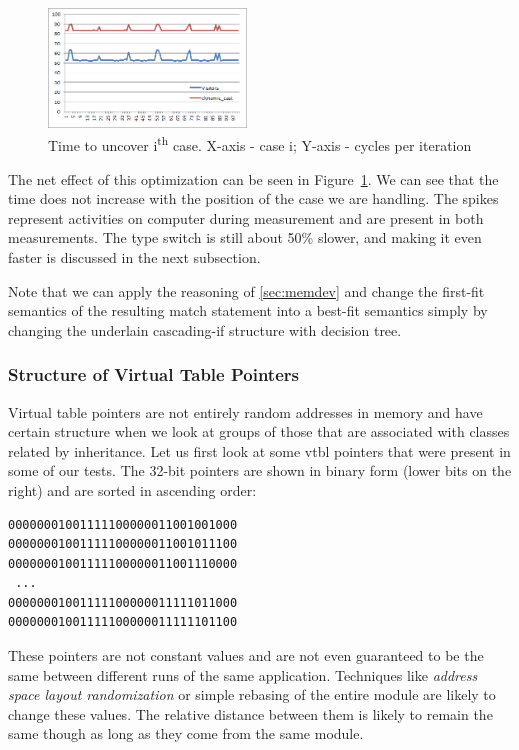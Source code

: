 \documentclass[preprint]{sigplanconf}
\begin{document}
\begin{figure}[htbp]
  \centering
    \includegraphics[width=0.47\textwidth]{DCast-vs-Visitors3.png}
  \caption{Time to uncover i\textsuperscript{th} case. X-axis - case i; Y-axis - cycles per iteration}
  \label{fig:DCastVis3}
\end{figure}

The net effect of this optimization can be seen in Figure~\ref{fig:DCastVis3}. 
We can see that the time does not increase with the position of the case we are 
handling. The spikes represent activities on computer during measurement and are 
present in both measurements. The type switch is still about 50\% slower, and 
making it even faster is discussed in the next subsection.

Note that we can apply the reasoning of \textsection\ref{sec:memdev} and change 
the first-fit semantics of the resulting match statement into a best-fit 
semantics simply by changing the underlain cascading-if structure with decision 
tree.

\subsubsection{Structure of Virtual Table Pointers}
\label{sec:sovtp}

Virtual table pointers are not entirely random addresses in memory and have 
certain structure when we look at groups of those that are associated with 
classes related by inheritance. Let us first look at some vtbl pointers that 
were present in some of our tests. The 32-bit pointers are shown in binary form 
(lower bits on the right) and are sorted in ascending order:

\begin{verbatim}
00000001001111100000011001001000
00000001001111100000011001011100
00000001001111100000011001110000
 ...
00000001001111100000011111011000
00000001001111100000011111101100
\end{verbatim}

These pointers are not constant values and are not even guaranteed to be the 
same between different runs of the same application. Techniques like 
\emph{address space layout randomization} or simple rebasing of the entire 
module are likely to change these values. The relative distance between them is 
likely to remain the same though as long as they come from the same module.
\end{document}
